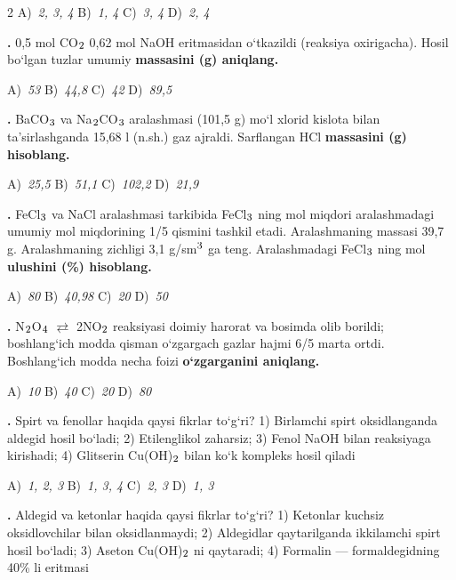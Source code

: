 \documentclass[11pt,a4paper]{article}
\renewcommand{\textsubscript}[1]{\ensuremath{_{\text{\fontsize{8}{8}\selectfont #1}}}}
\renewcommand{\textsuperscript}[1]{\ensuremath{^{\text{\fontsize{8}{8}\selectfont #1}}}}
\newcommand{\qn}[1]{\textbf{\fontsize{11.5}{13}\selectfont #1}}
\newcommand{\qsep}{\par\vspace{13pt}}
\begin{document}
\begin{multicols}{2}
\noindent A)~\textsl{2, 3, 4} \hfill B)~\textsl{1, 4} \hfill C)~\textsl{3, 4} \hfill D)~\textsl{2, 4}\par
\qsep
\noindent\qn{16.} 0,5 mol CO\textsubscript{2} 0,62 mol NaOH eritmasidan o`tkazildi (reaksiya oxirigacha). Hosil bo`lgan tuzlar umumiy \textbf{massasini (g) aniqlang.}

\noindent A)~\textsl{53} \hfill B)~\textsl{44,8} \hfill C)~\textsl{42} \hfill D)~\textsl{89,5}\par
\qsep
\noindent\qn{17.} BaCO\textsubscript{3} va Na\textsubscript{2}CO\textsubscript{3} aralashmasi (101,5 g) mo`l xlorid kislota bilan ta'sirlashganda 15,68 l (n.sh.) gaz ajraldi. Sarflangan HCl \textbf{massasini (g) hisoblang.}

\noindent A)~\textsl{25,5} \hfill B)~\textsl{51,1} \hfill C)~\textsl{102,2} \hfill D)~\textsl{21,9}\par
\qsep
\noindent\qn{18.} FeCl\textsubscript{3} va NaCl aralashmasi tarkibida FeCl\textsubscript{3} ning mol miqdori aralashmadagi umumiy mol miqdorining 1/5 qismini tashkil etadi. Aralashmaning massasi 39,7 g. Aralashmaning zichligi 3,1 g/sm\textsuperscript{3} ga teng. Aralashmadagi FeCl\textsubscript{3} ning mol \textbf{ulushini (\%) hisoblang.}

\noindent A)~\textsl{80} \hfill B)~\textsl{40,98} \hfill C)~\textsl{20} \hfill D)~\textsl{50}\par
\qsep
\noindent\qn{19.} N\textsubscript{2}O\textsubscript{4} $\rightleftarrows$ 2NO\textsubscript{2} reaksiyasi doimiy harorat va bosimda olib borildi; boshlang`ich modda qisman o`zgargach gazlar hajmi 6/5 marta ortdi. Boshlang`ich modda necha foizi \textbf{o`zgarganini aniqlang.}

\noindent A)~\textsl{10} \hfill B)~\textsl{40} \hfill C)~\textsl{20} \hfill D)~\textsl{80}\par
\qsep
\noindent\qn{20.} Spirt va fenollar haqida qaysi fikrlar to`g`ri? 1) Birlamchi spirt oksidlanganda aldegid hosil bo`ladi; 2) Etilenglikol zaharsiz; 3) Fenol NaOH bilan reaksiyaga kirishadi; 4) Glitserin Cu(OH)\textsubscript{2} bilan ko`k kompleks hosil qiladi

\noindent A)~\textsl{1, 2, 3} \hfill B)~\textsl{1, 3, 4} \hfill C)~\textsl{2, 3} \hfill D)~\textsl{1, 3}\par
\qsep
\noindent\qn{21.} Aldegid va ketonlar haqida qaysi fikrlar to`g`ri? 1) Ketonlar kuchsiz oksidlovchilar bilan oksidlanmaydi; 2) Aldegidlar qaytarilganda ikkilamchi spirt hosil bo`ladi; 3) Aseton Cu(OH)\textsubscript{2} ni qaytaradi; 4) Formalin --- formaldegidning 40\% li eritmasi


\end{multicols}
\end{document}
